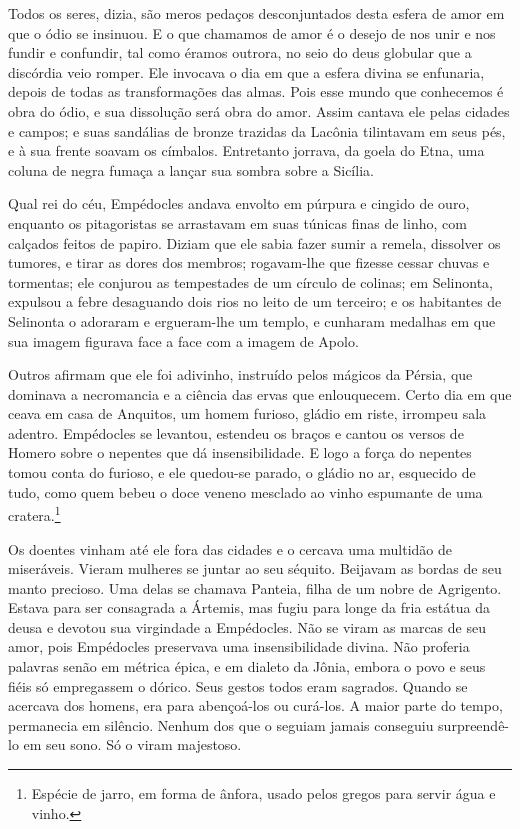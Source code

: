Todos os seres, dizia, são meros pedaços desconjuntados desta esfera de
amor em que o ódio se insinuou. E o que chamamos de amor é o desejo de nos
unir e nos fundir e confundir, tal como éramos outrora, no seio do deus
globular que a discórdia veio romper. Ele invocava o dia em que a esfera
divina se enfunaria, depois de todas as transformações das almas. Pois
esse mundo que conhecemos é obra do ódio, e sua dissolução será obra do
amor. Assim cantava ele pelas cidades e campos; e suas sandálias de bronze
trazidas da Lacônia tilintavam em seus pés, e à sua frente soavam os
címbalos. Entretanto jorrava, da goela do Etna, uma coluna de negra fumaça
a lançar sua sombra sobre a Sicília.

Qual rei do céu, Empédocles andava envolto em púrpura e cingido de ouro,
enquanto os pitagoristas se arrastavam em suas túnicas finas de linho, com
calçados feitos de papiro. Diziam que ele sabia fazer sumir a remela,
dissolver os tumores, e tirar as dores dos membros; rogavam-lhe que
fizesse cessar chuvas e tormentas; ele conjurou as tempestades de um
círculo de colinas; em Selinonta, expulsou a febre desaguando dois rios no
leito de um terceiro; e os habitantes de Selinonta o adoraram e
ergueram-lhe um templo, e cunharam medalhas em que sua imagem figurava
face a face com a imagem de Apolo.

Outros afirmam que ele foi adivinho, instruído pelos mágicos da Pérsia, que
dominava a necromancia e a ciência das ervas que enlouquecem. Certo dia em
que ceava em casa de Anquitos, um homem furioso, gládio em riste, irrompeu
sala adentro. Empédocles se levantou, estendeu os braços e cantou os
versos de Homero sobre o nepentes que dá insensibilidade. E logo a força
do nepentes tomou conta do furioso, e ele quedou-se parado, o gládio no
ar, esquecido de tudo, como quem bebeu o doce veneno mesclado ao vinho
espumante de uma cratera.\footnote{ Espécie de jarro, em forma de ânfora, usado pelos gregos para servir água e vinho.}

Os doentes vinham até ele fora das cidades e o cercava uma multidão de
miseráveis. Vieram mulheres se juntar ao seu séquito. Beijavam as bordas
de seu manto precioso. Uma delas se chamava Panteia, filha de um nobre de
Agrigento. Estava para ser consagrada a Ártemis, mas fugiu para longe da
fria estátua da deusa e devotou sua virgindade a Empédocles. Não se viram
as marcas de seu amor, pois Empédocles preservava uma insensibilidade
divina. Não proferia palavras senão em métrica épica, e em dialeto da
Jônia, embora o povo e seus fiéis só empregassem o dórico. Seus gestos
todos eram sagrados. Quando se acercava dos homens, era para abençoá-los
ou curá-los. A maior parte do tempo, permanecia em silêncio. Nenhum dos
que o seguiam jamais conseguiu surpreendê-lo em seu sono. Só o viram
majestoso.

